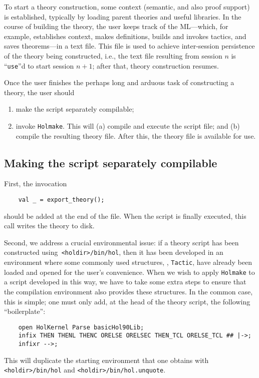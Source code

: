 \documentclass[12pt,fleqn,a4paper]{report}
\begin{document}
To start a theory construction, some context (semantic, and also proof
support) is established, typically by loading parent theories and
useful libraries. In the course of building the theory, the user keeps
track of the ML---which, for example, establishes context, makes
definitions, builds and invokes tactics, and saves theorems---in a
text file. This file is used to achieve inter-session persistence of
the theory being constructed, i.e., the text file resulting from
session $n$ is ``\verb+use+''d to start session $n+1$; after that,
theory construction resumes.

Once the user finishes the perhaps long and arduous task of constructing
a theory, the user should
\begin{enumerate}
\item make the script separately compilable;
\item invoke {\tt Holmake}. This will (a) compile and execute the
  script file; and (b) compile the resulting theory file. After this,
  the theory file is available for use.
\end{enumerate}

\subsection{Making the script separately compilable}

First, the invocation
\begin{verbatim}
    val _ = export_theory();
\end{verbatim}
should be added at the end of the file. When the script is finally
executed, this call writes the theory to disk.

Second, we address a crucial environmental issue: if a theory script
has been constructed using\verb+ <holdir>/bin/hol+, then it has been
developed in an environment where some commonly used structures, \eg,
\verb+Tactic+, have already been loaded and opened for the user's
convenience. When we wish to apply {\tt Holmake} to a script developed
in this way, we have to take some extra steps to ensure that the
compilation environment also provides these structures.  In the common
case, this is simple; one must only add, at the head of the theory
script, the following ``boilerplate'':
\begin{verbatim}
    open HolKernel Parse basicHol90Lib;
    infix THEN THENL THENC ORELSE ORELSEC THEN_TCL ORELSE_TCL ## |->;
    infixr -->;
\end{verbatim}
This will duplicate the starting environment that one obtains with
\verb+<holdir>/bin/hol+ and \verb+<holdir>/bin/hol.unquote+.
\end{document}
